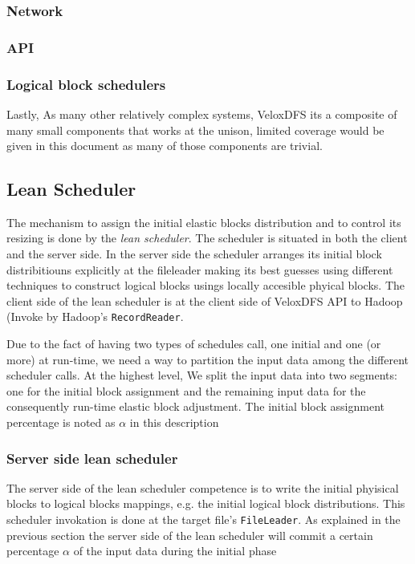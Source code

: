 \subsubsection{Network}
\lipsum[10]
\subsubsection{API}
\lipsum[10]

\subsubsection{Logical block schedulers}
\lipsum[10]

Lastly, As many other relatively complex systems, VeloxDFS its a composite of many small components that works at the unison, limited coverage would be given in this document as many of those components are trivial.


\subsection{Lean Scheduler}
The mechanism to assign the initial elastic blocks distribution and to control its resizing is done by the \textit{lean scheduler}. The scheduler is situated in both the client and the server side. In the server side the scheduler arranges its initial block distribitiouns explicitly at the fileleader making its best guesses using different techniques to construct logical blocks usings locally accesible phyical blocks. The client side of the lean scheduler is at the client side of VeloxDFS API to Hadoop (Invoke by Hadoop's \texttt{RecordReader}.

Due to the fact of having two types of schedules call, one initial and one (or more) at run-time, we need a way to partition the input data 
among the different scheduler calls. At the highest level, We split the input data into two segments: one for the initial block assignment and the remaining input data for the consequently run-time elastic block adjustment. The initial block assignment percentage is noted as $\alpha$ in this description

\subsubsection{Server side lean scheduler}
The server side of the lean scheduler competence is to write the initial phyisical blocks to logical blocks mappings, e.g. the initial logical block distributions. This scheduler invokation is done at the target file's \texttt{FileLeader}. As explained in the previous section the server side of the lean scheduler will commit a certain percentage $\alpha$ of the input data during the initial phase 

